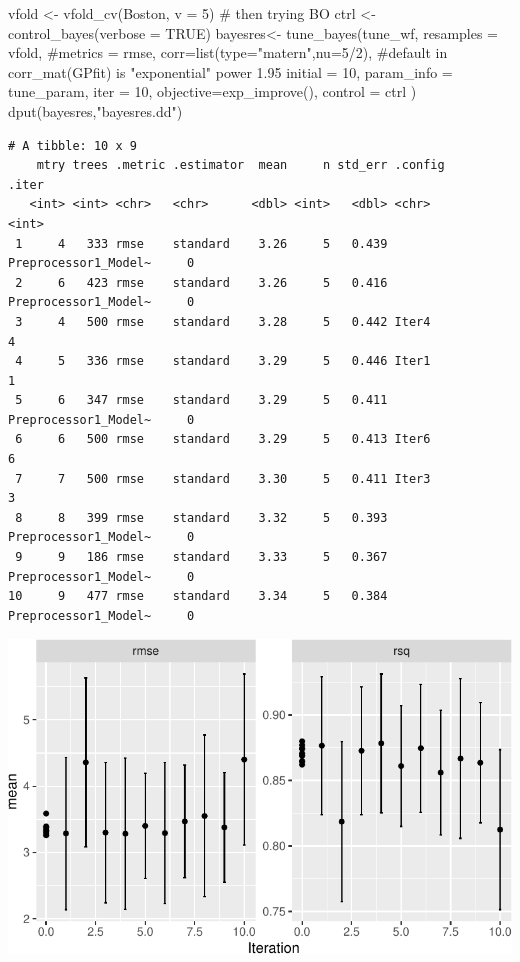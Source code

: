 \documentclass[
  letterpaper,
  DIV=11,
  numbers=noendperiod]{scrartcl}
\newenvironment{Shaded}{\begin{snugshade}}{\end{snugshade}}
\newcommand{\AttributeTok}[1]{\textcolor[rgb]{0.40,0.45,0.13}{#1}}
\newcommand{\CommentTok}[1]{\textcolor[rgb]{0.37,0.37,0.37}{#1}}
\newcommand{\ConstantTok}[1]{\textcolor[rgb]{0.56,0.35,0.01}{#1}}
\newcommand{\DecValTok}[1]{\textcolor[rgb]{0.68,0.00,0.00}{#1}}
\newcommand{\FunctionTok}[1]{\textcolor[rgb]{0.28,0.35,0.67}{#1}}
\newcommand{\NormalTok}[1]{\textcolor[rgb]{0.00,0.23,0.31}{#1}}
\newcommand{\OtherTok}[1]{\textcolor[rgb]{0.00,0.23,0.31}{#1}}
\newcommand{\SpecialCharTok}[1]{\textcolor[rgb]{0.37,0.37,0.37}{#1}}
\newcommand{\StringTok}[1]{\textcolor[rgb]{0.13,0.47,0.30}{#1}}
\begin{document}
\begin{Shaded}
\begin{Highlighting}[]
\NormalTok{vfold  }\OtherTok{\textless{}{-}} \FunctionTok{vfold\_cv}\NormalTok{(Boston, }\AttributeTok{v =} \DecValTok{5}\NormalTok{)}
\CommentTok{\# then trying BO}
\NormalTok{ctrl }\OtherTok{\textless{}{-}} \FunctionTok{control\_bayes}\NormalTok{(}\AttributeTok{verbose =} \ConstantTok{TRUE}\NormalTok{)}
\NormalTok{bayesres}\OtherTok{\textless{}{-}} \FunctionTok{tune\_bayes}\NormalTok{(tune\_wf,}
    \AttributeTok{resamples =}\NormalTok{ vfold,}
    \CommentTok{\#metrics = rmse,}
    \AttributeTok{corr=}\FunctionTok{list}\NormalTok{(}\AttributeTok{type=}\StringTok{"matern"}\NormalTok{,}\AttributeTok{nu=}\DecValTok{5}\SpecialCharTok{/}\DecValTok{2}\NormalTok{), }
    \CommentTok{\#default in corr\_mat(GPfit) is "exponential" power 1.95}
    \AttributeTok{initial =} \DecValTok{10}\NormalTok{,}
    \AttributeTok{param\_info =}\NormalTok{ tune\_param,}
    \AttributeTok{iter =} \DecValTok{10}\NormalTok{,}
    \AttributeTok{objective=}\FunctionTok{exp\_improve}\NormalTok{(),}
    \AttributeTok{control =}\NormalTok{ ctrl}
\NormalTok{  )}
\FunctionTok{dput}\NormalTok{(bayesres,}\StringTok{"bayesres.dd"}\NormalTok{)}
\end{Highlighting}
\end{Shaded}

\begin{verbatim}
# A tibble: 10 x 9
    mtry trees .metric .estimator  mean     n std_err .config              .iter
   <int> <int> <chr>   <chr>      <dbl> <int>   <dbl> <chr>                <int>
 1     4   333 rmse    standard    3.26     5   0.439 Preprocessor1_Model~     0
 2     6   423 rmse    standard    3.26     5   0.416 Preprocessor1_Model~     0
 3     4   500 rmse    standard    3.28     5   0.442 Iter4                    4
 4     5   336 rmse    standard    3.29     5   0.446 Iter1                    1
 5     6   347 rmse    standard    3.29     5   0.411 Preprocessor1_Model~     0
 6     6   500 rmse    standard    3.29     5   0.413 Iter6                    6
 7     7   500 rmse    standard    3.30     5   0.411 Iter3                    3
 8     8   399 rmse    standard    3.32     5   0.393 Preprocessor1_Model~     0
 9     9   186 rmse    standard    3.33     5   0.367 Preprocessor1_Model~     0
10     9   477 rmse    standard    3.34     5   0.384 Preprocessor1_Model~     0
\end{verbatim}

\includegraphics{L16_files/figure-pdf/unnamed-chunk-4-1.pdf}
\end{document}
